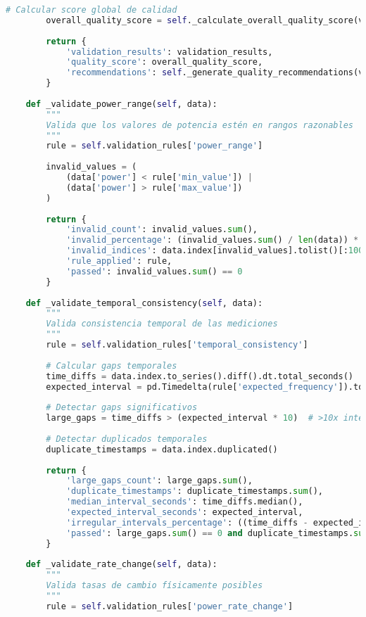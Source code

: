 \begin{lstlisting}[language=Python, caption=Framework de validación de calidad de datos]
        # Calcular score global de calidad
        overall_quality_score = self._calculate_overall_quality_score(validation_results)
        
        return {
            'validation_results': validation_results,
            'quality_score': overall_quality_score,
            'recommendations': self._generate_quality_recommendations(validation_results)
        }
    
    def _validate_power_range(self, data):
        """
        Valida que los valores de potencia estén en rangos razonables
        """
        rule = self.validation_rules['power_range']
        
        invalid_values = (
            (data['power'] < rule['min_value']) | 
            (data['power'] > rule['max_value'])
        )
        
        return {
            'invalid_count': invalid_values.sum(),
            'invalid_percentage': (invalid_values.sum() / len(data)) * 100,
            'invalid_indices': data.index[invalid_values].tolist()[:100],  # Primeros 100
            'rule_applied': rule,
            'passed': invalid_values.sum() == 0
        }
    
    def _validate_temporal_consistency(self, data):
        """
        Valida consistencia temporal de las mediciones
        """
        rule = self.validation_rules['temporal_consistency']
        
        # Calcular gaps temporales
        time_diffs = data.index.to_series().diff().dt.total_seconds()
        expected_interval = pd.Timedelta(rule['expected_frequency']).total_seconds()
        
        # Detectar gaps significativos
        large_gaps = time_diffs > (expected_interval * 10)  # >10x intervalo esperado
        
        # Detectar duplicados temporales
        duplicate_timestamps = data.index.duplicated()
        
        return {
            'large_gaps_count': large_gaps.sum(),
            'duplicate_timestamps': duplicate_timestamps.sum(),
            'median_interval_seconds': time_diffs.median(),
            'expected_interval_seconds': expected_interval,
            'irregular_intervals_percentage': ((time_diffs - expected_interval).abs() > 1).mean() * 100,
            'passed': large_gaps.sum() == 0 and duplicate_timestamps.sum() == 0
        }
    
    def _validate_rate_change(self, data):
        """
        Valida tasas de cambio físicamente posibles
        """
        rule = self.validation_rules['power_rate_change']
        

\end{lstlisting}
